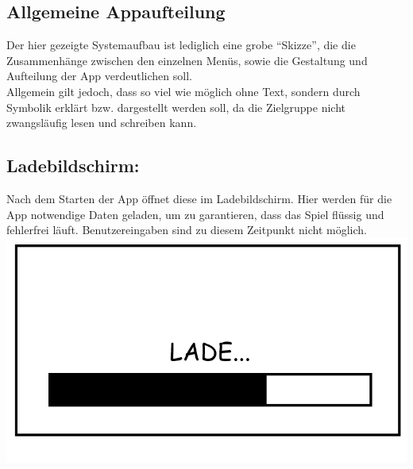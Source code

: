 \documentclass{scrartcl}
\begin{document}
\subsection{Allgemeine Appaufteilung}

Der hier gezeigte Systemaufbau ist lediglich eine grobe \enquote{Skizze},
die die Zusammenhänge zwischen den einzelnen Menüs, sowie
die Gestaltung und Aufteilung der App verdeutlichen soll.\\
Allgemein gilt jedoch, dass so viel wie möglich ohne Text, sondern durch Symbolik erklärt bzw. dargestellt werden soll, da die Zielgruppe nicht zwangsläufig lesen und schreiben kann.\\

\begin{enumerate}
	\begin{minipage}{1\textwidth}
		\item \subsection*{Ladebildschirm:} \label{appaufbau:Ladebildschirm}
		Nach dem Starten der App öffnet diese im Ladebildschirm. Hier werden für die App notwendige Daten geladen, um zu garantieren, dass das Spiel flüssig und fehlerfrei läuft. Benutzereingaben sind zu diesem Zeitpunkt nicht möglich.\\
		\includegraphics[scale=0.5]{assets/LoadScreen}
	\end{minipage}
	
	\begin{minipage}{1\textwidth}
		

\end{minipage}
\end{enumerate}
\end{document}
